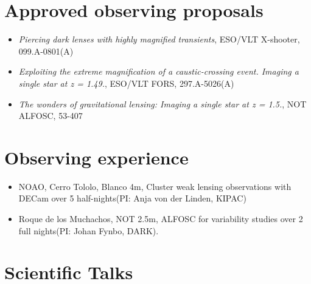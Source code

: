 \documentclass[12pt,letterpaper]{article}
\begin{document}
\newpage

\section*{Approved observing proposals}

	\begin{itemize}
    \item {\it Piercing dark lenses with highly magnified transients}, ESO/VLT X-shooter,  099.A-0801(A)
    \item {\it Exploiting the extreme magnification of a caustic-crossing event. Imaging a single star at z = 1.49.}, ESO/VLT FORS,  297.A-5026(A)
    \item {\it The wonders of gravitational lensing: Imaging a single star at z = 1.5.}, NOT ALFOSC,  53-407
	\end{itemize}

\section*{Observing experience}

\begin{itemize}
	\item NOAO, Cerro Tololo, Blanco 4m, Cluster weak lensing observations with DECam over 5 half-nights(PI: Anja von der Linden, KIPAC)
	\item Roque de los Muchachos, NOT 2.5m, ALFOSC for variability studies over 2 full nights(PI: Johan Fynbo, DARK).
\end{itemize}


\section*{Scientific Talks}
\end{document}
